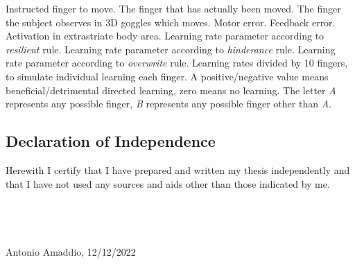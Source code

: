 \documentclass[man]{apa7}
\begin{document}
\begin{table}
\begin{tablenotes}
{            Instructed finger to move.
            The finger that has actually been moved.
            The finger the subject observes in 3D goggles which moves.
            Motor error.
            Feedback error.
            Activation in extrastriate body area.
            Learning rate parameter according to \textit{resilient} rule.
            Learning rate parameter according to \textit{hinderance} rule.
            Learning rate parameter according to \textit{overwrite} rule. Learning rates divided by 10 fingers, to simulate individual learning each finger. A positive/negative value means beneficial/detrimental directed learning, zero means no learning.
            The letter \textit{A} represents any possible finger, \textit{B} represents any possible finger other than \textit{A}.
         }
    \end{tablenotes}
\end{table}


\subsection{Declaration of Independence}

Herewith I certify that I have prepared and written my thesis independently and that I have not used any sources and aids other than those indicated by me. \\
\mbox{}\\
\mbox{}\\
\mbox{}\\
\mbox{}\\
Antonio Amaddio, 12/12/2022
\end{document}
